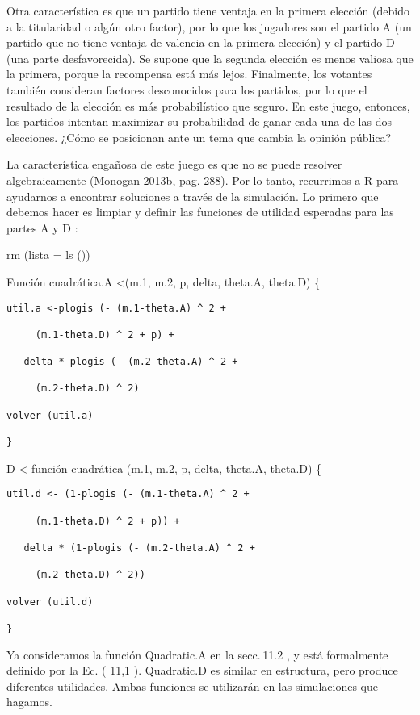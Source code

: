 \documentclass[
]{book}
\begin{document}
Otra característica es que un partido tiene ventaja en la primera elección (debido a la titularidad o algún otro factor), por lo que los jugadores son el partido A (un partido que no tiene ventaja de valencia en la primera elección) y el partido D (una parte desfavorecida). Se supone que la segunda elección es menos valiosa que la primera, porque la recompensa está más lejos. Finalmente, los votantes también consideran factores desconocidos para los partidos, por lo que el resultado de la elección es más probabilístico que seguro. En este juego, entonces, los partidos intentan maximizar su probabilidad de ganar cada una de las dos elecciones. ¿Cómo se posicionan ante un tema que cambia la opinión pública?

La característica engañosa de este juego es que no se puede resolver algebraicamente (Monogan 2013b, pag. 288). Por lo tanto, recurrimos a R para ayudarnos a encontrar soluciones a través de la simulación. Lo primero que debemos hacer es limpiar y definir las funciones de utilidad esperadas para las partes A y D :

rm (lista = ls ())

Función cuadrática.A \textless(m.1, m.2, p, delta, theta.A, theta.D) \{

\begin{verbatim}
util.a <-plogis (- (m.1-theta.A) ^ 2 +

     (m.1-theta.D) ^ 2 + p) +

   delta * plogis (- (m.2-theta.A) ^ 2 +

     (m.2-theta.D) ^ 2)

volver (util.a)

}
\end{verbatim}

D \textless-función cuadrática (m.1, m.2, p, delta, theta.A, theta.D) \{

\begin{verbatim}
util.d <- (1-plogis (- (m.1-theta.A) ^ 2 +

     (m.1-theta.D) ^ 2 + p)) +

   delta * (1-plogis (- (m.2-theta.A) ^ 2 +

     (m.2-theta.D) ^ 2))

volver (util.d)

}
\end{verbatim}

Ya consideramos la función Quadratic.A en la secc. 11.2 , y está formalmente definido por la Ec. ( 11,1 ). Quadratic.D es similar en estructura, pero produce diferentes utilidades. Ambas funciones se utilizarán en las simulaciones que hagamos.
\end{document}
